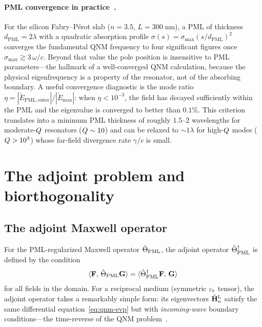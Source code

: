 \paragraph{PML convergence in practice~\cite{opg2023dispersive,v2024exact}.}
For the silicon Fabry--P\'erot slab ($n = 3.5$, $L = 300\;\mathrm{nm}$),
a PML of thickness $d_{\mathrm{PML}} = 2\lambda$ with a quadratic
absorption profile $\sigma(s) = \sigma_{\max}(s/d_{\mathrm{PML}})^2$
converges the fundamental QNM frequency to four significant figures once
$\sigma_{\max} \gtrsim 3\,\omega/c$. Beyond that value the pole
position is insensitive to PML parameters---the hallmark of a
well-converged QNM calculation, because the physical eigenfrequency is a
property of the resonator, not of the absorbing boundary. A useful
convergence diagnostic is the mode ratio
$\eta = |\tilde{E}_{\mathrm{PML,outer}}|/|\tilde{E}_{\max}|$: when
$\eta < 10^{-3}$, the field has decayed sufficiently within the PML and
the eigenvalue is converged to better than $0.1\%$. This criterion
translates into a minimum PML thickness of roughly $1.5$--$2$ wavelengths
for moderate-$Q$ resonators ($Q \sim 10$) and can be relaxed to
$\sim 1\lambda$ for high-$Q$ modes ($Q > 10^3$) whose
far-field divergence rate $\gamma/c$ is small.


\section{The adjoint problem and biorthogonality}
\label{sec:qnm-adjoint}

\subsection{The adjoint Maxwell operator}
\label{ssec:adjoint-operator}

For the PML-regularized Maxwell operator $\hat{\Theta}_{\mathrm{PML}}$, the
adjoint operator $\hat{\Theta}_{\mathrm{PML}}^\dagger$ is defined by the condition
\begin{equation}
 \langle\mathbf{F},\,\hat{\Theta}_{\mathrm{PML}}\mathbf{G}\rangle
 = \langle\hat{\Theta}_{\mathrm{PML}}^\dagger\mathbf{F},\,\mathbf{G}\rangle
 \label{eq:adjoint-def}
\end{equation}
for all fields in the domain. For a reciprocal medium (symmetric
$\varepsilon_{\mathrm{r}}$ tensor), the adjoint operator takes a remarkably simple form:
its eigenvectors $\tilde{\mathbf{H}}_n^{\mathrm{L}}$ satisfy the same
differential equation~\eqref{eq:qnm-evp} but with \emph{incoming-wave}
boundary conditions---the time-reverse of the QNM
problem~\cite{vial2014quasimodal}.

